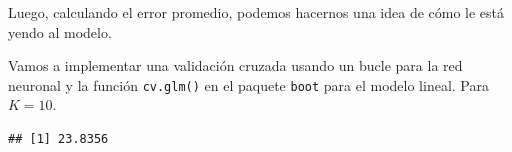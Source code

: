 \documentclass[]{book}
\newenvironment{Shaded}{\begin{snugshade}}{\end{snugshade}}
\newcommand{\KeywordTok}[1]{\textcolor[rgb]{0.13,0.29,0.53}{\textbf{#1}}}
\newcommand{\DataTypeTok}[1]{\textcolor[rgb]{0.13,0.29,0.53}{#1}}
\newcommand{\DecValTok}[1]{\textcolor[rgb]{0.00,0.00,0.81}{#1}}
\newcommand{\StringTok}[1]{\textcolor[rgb]{0.31,0.60,0.02}{#1}}
\newcommand{\OperatorTok}[1]{\textcolor[rgb]{0.81,0.36,0.00}{\textbf{#1}}}
\newcommand{\NormalTok}[1]{#1}
\begin{document}
Luego, calculando el error promedio, podemos hacernos una idea de cómo
le está yendo al modelo.

Vamos a implementar una validación cruzada usando un bucle para la red
neuronal y la función \texttt{cv.glm()} en el paquete \texttt{boot} para
el modelo lineal. Para \(K=10\).

\begin{Shaded}
\end{Shaded}

\begin{verbatim}
## [1] 23.8356
\end{verbatim}
\end{document}
